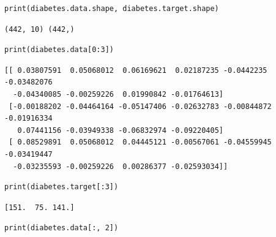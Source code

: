 \documentclass[11pt]{article}
\begin{document}
\begin{verbatim}
print(diabetes.data.shape, diabetes.target.shape)
\end{verbatim}

\begin{verbatim}
(442, 10) (442,)
\end{verbatim}


\begin{verbatim}
print(diabetes.data[0:3])
\end{verbatim}

\begin{verbatim}
[[ 0.03807591  0.05068012  0.06169621  0.02187235 -0.0442235  -0.03482076
  -0.04340085 -0.00259226  0.01990842 -0.01764613]
 [-0.00188202 -0.04464164 -0.05147406 -0.02632783 -0.00844872 -0.01916334
   0.07441156 -0.03949338 -0.06832974 -0.09220405]
 [ 0.08529891  0.05068012  0.04445121 -0.00567061 -0.04559945 -0.03419447
  -0.03235593 -0.00259226  0.00286377 -0.02593034]]
\end{verbatim}



\begin{verbatim}
print(diabetes.target[:3])
\end{verbatim}

\begin{verbatim}
[151.  75. 141.]
\end{verbatim}


\begin{verbatim}
print(diabetes.data[:, 2])
\end{verbatim}
\end{document}
